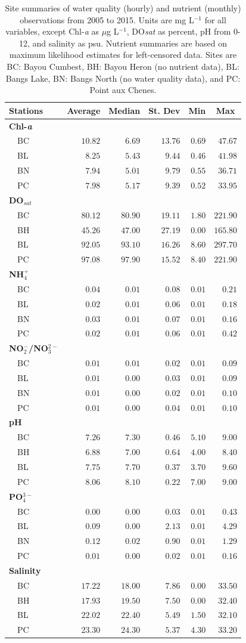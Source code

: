 \documentclass[letterpaper,12pt]{article}\usepackage[]{graphicx}\usepackage[]{color}
\begin{document}
\begin{table}[!tbp]
\caption{Site summaries of water quality (hourly) and nutrient (monthly) observations from 2005 to 2015.  Units are mg L$^{-1}$ for all variables, except Chl-\textit{a} as $\mu$g L$^{-1}$, DO\textit{sat} as percent, pH from 0-12, and salinity as psu. Nutrient summaries are based on maximum likelihood estimates for left-censored data.  Sites are BC: Bayou Cumbest, BH: Bayou Heron (no nutrient data), BL: Bangs Lake, BN: Bangs North (no water quality data), and PC: Point aux Chenes.\label{tab:summtab}} 
\begin{center}
\begin{tabular}{lrrrrr}
\hline\hline
\multicolumn{1}{l}{Stations}&\multicolumn{1}{c}{Average}&\multicolumn{1}{c}{Median}&\multicolumn{1}{c}{St. Dev}&\multicolumn{1}{c}{Min}&\multicolumn{1}{c}{Max}\tabularnewline
\hline
{\bfseries Chl-\textit{a}}&&&&&\tabularnewline
~~BC&$10.82$&$ 6.69$&$13.76$&$0.69$&$ 47.67$\tabularnewline
~~BL&$ 8.25$&$ 5.43$&$ 9.44$&$0.46$&$ 41.98$\tabularnewline
~~BN&$ 7.94$&$ 5.01$&$ 9.79$&$0.55$&$ 36.71$\tabularnewline
~~PC&$ 7.98$&$ 5.17$&$ 9.39$&$0.52$&$ 33.95$\tabularnewline
\hline
{\bfseries DO$_{sat}$}&&&&&\tabularnewline
~~BC&$80.12$&$80.90$&$19.11$&$1.80$&$221.90$\tabularnewline
~~BH&$45.26$&$47.00$&$27.19$&$0.00$&$165.80$\tabularnewline
~~BL&$92.05$&$93.10$&$16.26$&$8.60$&$297.70$\tabularnewline
~~PC&$97.08$&$97.90$&$15.52$&$8.40$&$221.90$\tabularnewline
\hline
{\bfseries NH$_4^+$}&&&&&\tabularnewline
~~BC&$ 0.04$&$ 0.01$&$ 0.08$&$0.01$&$  0.21$\tabularnewline
~~BL&$ 0.02$&$ 0.01$&$ 0.06$&$0.01$&$  0.18$\tabularnewline
~~BN&$ 0.03$&$ 0.01$&$ 0.07$&$0.01$&$  0.16$\tabularnewline
~~PC&$ 0.02$&$ 0.01$&$ 0.06$&$0.01$&$  0.42$\tabularnewline
\hline
{\bfseries NO$_2^-$/NO$_3^{2-}$}&&&&&\tabularnewline
~~BC&$ 0.01$&$ 0.01$&$ 0.02$&$0.01$&$  0.09$\tabularnewline
~~BL&$ 0.01$&$ 0.00$&$ 0.03$&$0.01$&$  0.09$\tabularnewline
~~BN&$ 0.01$&$ 0.00$&$ 0.02$&$0.01$&$  0.10$\tabularnewline
~~PC&$ 0.01$&$ 0.00$&$ 0.04$&$0.01$&$  0.10$\tabularnewline
\hline
{\bfseries pH}&&&&&\tabularnewline
~~BC&$ 7.26$&$ 7.30$&$ 0.46$&$5.10$&$  9.00$\tabularnewline
~~BH&$ 6.88$&$ 7.00$&$ 0.64$&$4.00$&$  8.40$\tabularnewline
~~BL&$ 7.75$&$ 7.70$&$ 0.37$&$3.70$&$  9.60$\tabularnewline
~~PC&$ 8.06$&$ 8.10$&$ 0.22$&$7.00$&$  9.00$\tabularnewline
\hline
{\bfseries PO$_4^{3-}$}&&&&&\tabularnewline
~~BC&$ 0.00$&$ 0.00$&$ 0.03$&$0.01$&$  0.43$\tabularnewline
~~BL&$ 0.09$&$ 0.00$&$ 2.13$&$0.01$&$  4.29$\tabularnewline
~~BN&$ 0.12$&$ 0.02$&$ 0.90$&$0.01$&$  1.29$\tabularnewline
~~PC&$ 0.01$&$ 0.00$&$ 0.02$&$0.01$&$  0.16$\tabularnewline
\hline
{\bfseries Salinity}&&&&&\tabularnewline
~~BC&$17.22$&$18.00$&$ 7.86$&$0.00$&$ 33.50$\tabularnewline
~~BH&$17.93$&$19.50$&$ 7.50$&$0.00$&$ 32.40$\tabularnewline
~~BL&$22.02$&$22.40$&$ 5.49$&$1.50$&$ 32.10$\tabularnewline
~~PC&$23.30$&$24.30$&$ 5.37$&$4.30$&$ 33.20$\tabularnewline
\hline
\end{tabular}\end{center}
\end{table}
\end{document}
